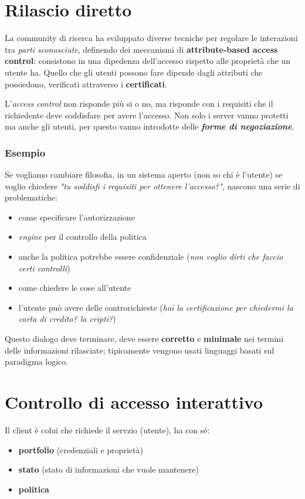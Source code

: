 \documentclass{report}
\begin{document}
\section{Rilascio diretto}
La community di ricerca ha sviluppato diverse tecniche per regolare le interazioni
tra \textit{parti sconosciute}, definendo dei
meccanismi di \textbf{attribute-based access control}: consistono in una dipedenza dell'accesso rispetto alle proprietà che un utente ha.
Quello che gli utenti possono fare dipende dagli attributi che possiedono, verificati attraverso i \textbf{certificati}.

L'\textit{access control} non risponde più si o no, ma risponde con i requisiti che il richiedente deve soddisfare per avere l'accesso.
Non solo i server vanno protetti ma anche gli utenti, per questo vanno introdotte delle \textit{\textbf{forme di negoziazione}}.

\subsubsection{Esempio}

Se vogliamo cambiare filosofia, in un sistema aperto (non so chi è l'utente) se
voglio chiedere \textit{"tu soddisfi i requisiti per ottenere l'accesso?"}, 
nascono una serie di problematiche:
\begin{itemize}
    \item come specificare l'autorizzazione
    \item \textit{engine} per il controllo della politica
    \item anche la politica potrebbe essere confidenziale (\textit{non voglio dirti che faccio certi controlli})
    \item come chiedere le cose all'utente
    \item l'utente può avere delle controrichieste (\textit{hai la certificazione per chiedermi la carta di credito? la cripti?})
\end{itemize}

\noindent Questo dialogo deve terminare, deve essere \textbf{corretto} e \textbf{minimale}
nei termini delle informazioni rilasciate; tipicamente vengono usati linguaggi basati sul paradigma logico.

\newpage
\section{Controllo di accesso interattivo}
Il client è colui che richiede il servzio (utente), ha con sé:
\begin{itemize}
    \item \textbf{portfolio} (credenziali e proprietà)
    \item \textbf{stato}
    (stato di informazioni che vuole mantenere)
    \item \textbf{politica}
\end{itemize}
\end{document}
